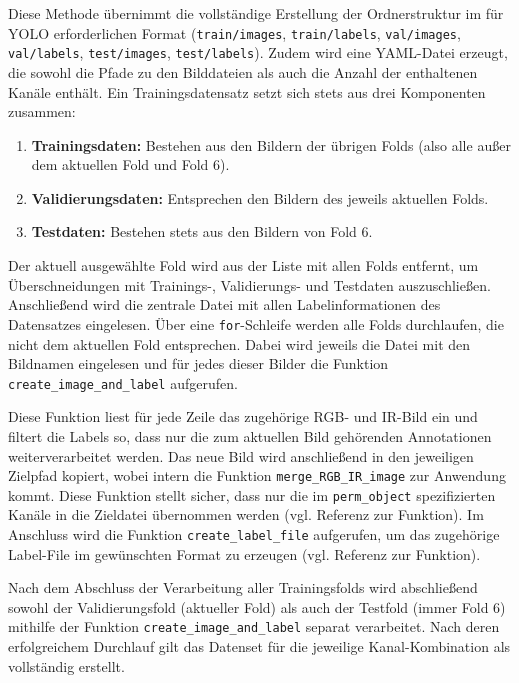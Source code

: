 Diese Methode übernimmt die vollständige Erstellung der Ordnerstruktur im für \acrshort{YOLO} erforderlichen Format (\texttt{train/images}, \texttt{train/labels}, \texttt{val/images}, \texttt{val/labels}, \texttt{test/images}, \texttt{test/labels}). Zudem wird eine \acrshort{YAML}-Datei erzeugt, die sowohl die Pfade zu den Bilddateien als auch die Anzahl der enthaltenen Kanäle enthält. Ein Trainingsdatensatz setzt sich stets aus drei Komponenten zusammen: 
\begin{enumerate}
    \item \textbf{Trainingsdaten:} Bestehen aus den Bildern der übrigen Folds (also alle außer dem aktuellen Fold und Fold 6).
    \item \textbf{Validierungsdaten:} Entsprechen den Bildern des jeweils aktuellen Folds.
    \item \textbf{Testdaten:} Bestehen stets aus den Bildern von Fold 6.
\end{enumerate}

Der aktuell ausgewählte Fold wird aus der Liste mit allen Folds entfernt, um Überschneidungen mit Trainings-, Validierungs- und Testdaten auszuschließen. Anschließend wird die zentrale Datei mit allen Labelinformationen des Datensatzes eingelesen. Über eine \texttt{for}-Schleife werden alle Folds durchlaufen, die nicht dem aktuellen Fold entsprechen. Dabei wird jeweils die Datei mit den Bildnamen eingelesen und für jedes dieser Bilder die Funktion \texttt{create\_image\_and\_label} aufgerufen.

Diese Funktion liest für jede Zeile das zugehörige \acrshort{RGB}- und \acrshort{IR}-Bild ein und filtert die Labels so, dass nur die zum aktuellen Bild gehörenden Annotationen weiterverarbeitet werden. Das neue Bild wird anschließend in den jeweiligen Zielpfad kopiert, wobei intern die Funktion \texttt{merge\_RGB\_IR\_image} zur Anwendung kommt. Diese Funktion stellt sicher, dass nur die im \texttt{perm\_object} spezifizierten Kanäle in die Zieldatei übernommen werden (vgl. Referenz zur Funktion). Im Anschluss wird die Funktion \texttt{create\_label\_file} aufgerufen, um das zugehörige Label-File im gewünschten Format zu erzeugen (vgl.  Referenz zur Funktion).

Nach dem Abschluss der Verarbeitung aller Trainingsfolds wird abschließend sowohl der Validierungsfold (aktueller Fold) als auch der Testfold (immer Fold 6) mithilfe der Funktion \texttt{create\_image\_and\_label} separat verarbeitet. Nach deren erfolgreichem Durchlauf gilt das Datenset für die jeweilige Kanal-Kombination als vollständig erstellt.

